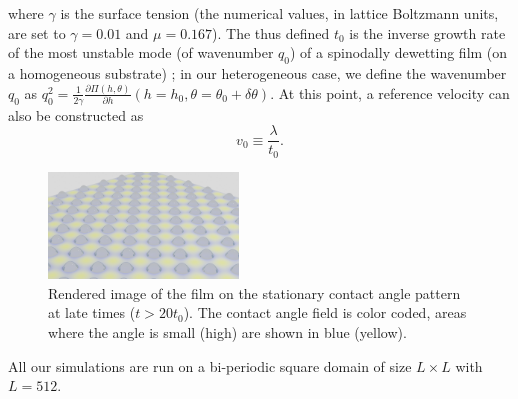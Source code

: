 \documentclass[twocolumn,amsmath,amssymb,showpacs,pre,nofootinbib,superscriptaddress]{revtex4-1} %
\begin{document}
where $\gamma$ is the surface tension
(the numerical values, in lattice Boltzmann units, are set to $\gamma = 0.01$ and $\mu=0.167$).
The thus defined $t_0$ is the inverse growth rate of the most unstable mode (of wavenumber $q_0$)
of a spinodally dewetting film (on a homogeneous substrate) \cite{Mecke_2005,PhysRevE.100.023108};
in our heterogeneous case, we define the wavenumber $q_0$ as 
$q_0^2=\frac{1}{2\gamma}\frac{\partial \Pi(h,\theta)}{\partial h}(h=h_0,\theta=\theta_0+\delta \theta)$.
At this point, a reference velocity can also be constructed as
\begin{equation}\label{eq:v0}
v_0 \equiv \frac{\lambda}{t_0}.
\end{equation}
\begin{figure}
    \centering
    \includegraphics[width=0.45\textwidth]{Figures/No_vel_render.png}
    \caption{Rendered image of the film on the stationary contact angle pattern at late times ($t > 20t_0$).
    The contact angle field is color coded, areas where the angle is small (high) are shown in blue (yellow).}
    \label{fig:handtheta}
\end{figure}
All our simulations are run on a bi-periodic square domain of size $L \times L$ with $L = 512$.
\end{document}
